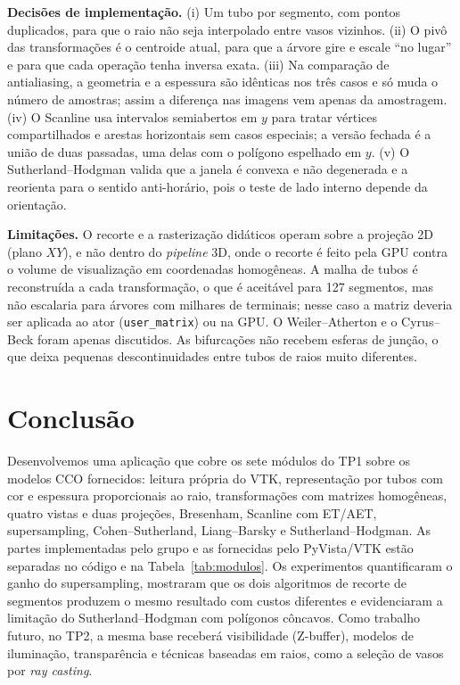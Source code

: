\documentclass[11pt, a4paper]{article}
\begin{document}
\textbf{Decisões de implementação.} (i) Um tubo por segmento, com pontos duplicados, para que o raio não seja interpolado entre vasos vizinhos. (ii) O pivô das transformações é o centroide atual, para que a árvore gire e escale ``no lugar'' e para que cada operação tenha inversa exata. (iii) Na comparação de antialiasing, a geometria e a espessura são idênticas nos três casos e só muda o número de amostras; assim a diferença nas imagens vem apenas da amostragem. (iv) O Scanline usa intervalos semiabertos em $y$ para tratar vértices compartilhados e arestas horizontais sem casos especiais; a versão fechada é a união de duas passadas, uma delas com o polígono espelhado em $y$. (v) O Sutherland--Hodgman valida que a janela é convexa e não degenerada e a reorienta para o sentido anti-horário, pois o teste de lado interno depende da orientação.

\textbf{Limitações.} O recorte e a rasterização didáticos operam sobre a projeção 2D (plano $XY$), e não dentro do \emph{pipeline} 3D, onde o recorte é feito pela GPU contra o volume de visualização em coordenadas homogêneas. A malha de tubos é reconstruída a cada transformação, o que é aceitável para 127 segmentos, mas não escalaria para árvores com milhares de terminais; nesse caso a matriz deveria ser aplicada ao ator (\texttt{user\_matrix}) ou na GPU. O Weiler--Atherton e o Cyrus--Beck foram apenas discutidos. As bifurcações não recebem esferas de junção, o que deixa pequenas descontinuidades entre tubos de raios muito diferentes.

\section{Conclusão}
Desenvolvemos uma aplicação que cobre os sete módulos do TP1 sobre os modelos CCO fornecidos: leitura própria do VTK, representação por tubos com cor e espessura proporcionais ao raio, transformações com matrizes homogêneas, quatro vistas e duas projeções, Bresenham, Scanline com ET/AET, supersampling, Cohen--Sutherland, Liang--Barsky e Sutherland--Hodgman. As partes implementadas pelo grupo e as fornecidas pelo PyVista/VTK estão separadas no código e na Tabela~\ref{tab:modulos}. Os experimentos quantificaram o ganho do supersampling, mostraram que os dois algoritmos de recorte de segmentos produzem o mesmo resultado com custos diferentes e evidenciaram a limitação do Sutherland--Hodgman com polígonos côncavos. Como trabalho futuro, no TP2, a mesma base receberá visibilidade (Z-buffer), modelos de iluminação, transparência e técnicas baseadas em raios, como a seleção de vasos por \emph{ray casting}.
\end{document}
